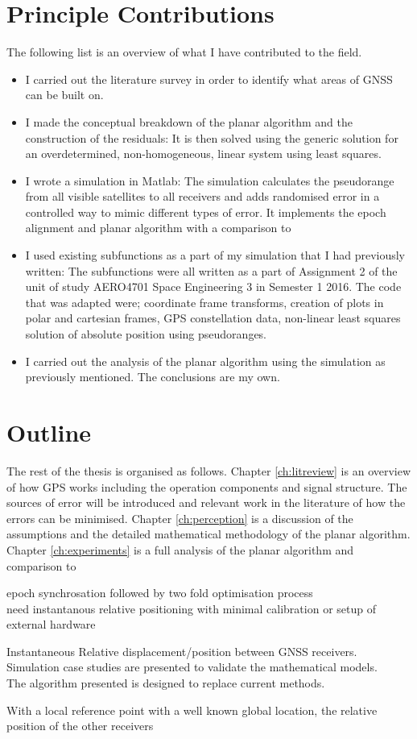 \section{Principle Contributions}
The following list is an overview of what I have contributed to the field. 
\begin{itemize}
\item I carried out the literature survey in order to identify what areas of GNSS can be built on.
\item I made the conceptual breakdown of the planar algorithm and the construction of the residuals: It is then solved using the generic solution for an overdetermined, non-homogeneous, linear system using least squares.
\item I wrote a simulation in Matlab: The simulation calculates the pseudorange from all visible satellites to all receivers and adds randomised error in a controlled way to mimic different types of error. It implements the epoch alignment and planar algorithm with a comparison to 
\item I used existing subfunctions as a part of my simulation that I had previously written: The subfunctions were all written as a part of Assignment 2 of the unit of study AERO4701 Space Engineering 3 in Semester 1 2016. The code that was adapted were; coordinate frame transforms, creation of plots in polar and cartesian frames, GPS constellation data, non-linear least squares solution of absolute position using pseudoranges.
\item I carried out the analysis of the planar algorithm using the simulation as previously mentioned. The conclusions are my own.
\end{itemize}


\section{Outline}
The rest of the thesis is organised as follows. Chapter \ref{ch:litreview} is an overview of how GPS works including the operation components and signal structure. The sources of error will be introduced and relevant work in the literature of how the errors can be minimised. Chapter \ref{ch:perception} is a discussion of the assumptions and the detailed mathematical methodology of the planar algorithm. Chapter \ref{ch:experiments} is a full analysis of the planar algorithm and comparison to 



epoch synchrosation followed by two fold optimisation process\\
need instantanous relative positioning with minimal calibration or setup of external hardware

Instantaneous Relative displacement/position between GNSS receivers.\\
Simulation case studies are presented to validate the mathematical models.\\

The algorithm presented is designed to replace current methods.

With a local reference point with a well known global location, the relative position of the other receivers 